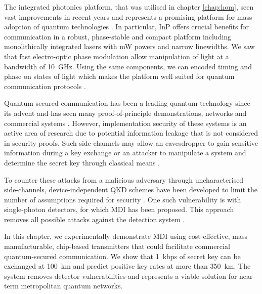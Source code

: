 The integrated photonics platform, that was utilised in chapter \ref{chap:hom}, seen vast improvements in recent years and represents a promising platform for mass-adoption of quantum technologies \cite{thompson2011}. In particular, \ac{InP} offers crucial benefits for communication in a robust, phase-stable and compact platform including monolithically integrated lasers with mW powers and narrow linewidths. We saw that fast electro-optic phase modulation allow manipulation of light at a bandwidth of \SI{10}{GHz}. Using the same components, we can encoded timing and phase on states of light which makes the platform well suited for quantum communication protocols \cite{Sibson2017InP}. 


Quantum-secured communication has been a leading quantum technology since its advent \cite{BB84, E91} and has seen many proof-of-principle demonstrations, networks and commercial systems \cite{yin2016, Rubenok2013, Comandar2016, zhang2018, commercial}. However, implementation security of these systems is an active area of research due to potential information leakage that is not considered in security proofs. Such side-channels may allow an eavesdropper to gain sensitive information during a key exchange \cite{Lo2014} or an attacker to manipulate a system and determine the secret key through classical means \cite{Lydersen2010b, lydersen2011controlling}. 

To counter these attacks from a malicious adversary through uncharacterised side-channels, device-independent \ac{QKD} schemes have been developed to limit the number of assumptions required for security \cite{Masanes2011}. One such vulnerability is with single-photon detectors, for which \ac{MDI} has been proposed. This approach removes all possible attacks against the detection system \cite{mdi-qkd}.

In this chapter, we experimentally demonstrate \ac{MDI} using cost-effective, mass manufacturable, chip-based transmitters that could facilitate commercial quantum-secured communication. We show that \SI{1}{kbps} of secret key can be exchanged at  \SI{100}{km} and predict positive key rates at more than \SI{350}{km}. The system removes detector vulnerabilities and represents a viable solution for near-term metropolitan quantum networks.



